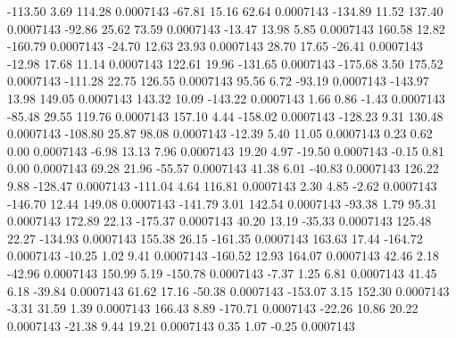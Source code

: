      -113.50        3.69      114.28     0.0007143
      -67.81       15.16       62.64     0.0007143
     -134.89       11.52      137.40     0.0007143
      -92.86       25.62       73.59     0.0007143
      -13.47       13.98        5.85     0.0007143
      160.58       12.82     -160.79     0.0007143
      -24.70       12.63       23.93     0.0007143
       28.70       17.65      -26.41     0.0007143
      -12.98       17.68       11.14     0.0007143
      122.61       19.96     -131.65     0.0007143
     -175.68        3.50      175.52     0.0007143
     -111.28       22.75      126.55     0.0007143
       95.56        6.72      -93.19     0.0007143
     -143.97       13.98      149.05     0.0007143
      143.32       10.09     -143.22     0.0007143
        1.66        0.86       -1.43     0.0007143
      -85.48       29.55      119.76     0.0007143
      157.10        4.44     -158.02     0.0007143
     -128.23        9.31      130.48     0.0007143
     -108.80       25.87       98.08     0.0007143
      -12.39        5.40       11.05     0.0007143
        0.23        0.62        0.00     0.0007143
       -6.98       13.13        7.96     0.0007143
       19.20        4.97      -19.50     0.0007143
       -0.15        0.81        0.00     0.0007143
       69.28       21.96      -55.57     0.0007143
       41.38        6.01      -40.83     0.0007143
      126.22        9.88     -128.47     0.0007143
     -111.04        4.64      116.81     0.0007143
        2.30        4.85       -2.62     0.0007143
     -146.70       12.44      149.08     0.0007143
     -141.79        3.01      142.54     0.0007143
      -93.38        1.79       95.31     0.0007143
      172.89       22.13     -175.37     0.0007143
       40.20       13.19      -35.33     0.0007143
      125.48       22.27     -134.93     0.0007143
      155.38       26.15     -161.35     0.0007143
      163.63       17.44     -164.72     0.0007143
      -10.25        1.02        9.41     0.0007143
     -160.52       12.93      164.07     0.0007143
       42.46        2.18      -42.96     0.0007143
      150.99        5.19     -150.78     0.0007143
       -7.37        1.25        6.81     0.0007143
       41.45        6.18      -39.84     0.0007143
       61.62       17.16      -50.38     0.0007143
     -153.07        3.15      152.30     0.0007143
       -3.31       31.59        1.39     0.0007143
      166.43        8.89     -170.71     0.0007143
      -22.26       10.86       20.22     0.0007143
      -21.38        9.44       19.21     0.0007143
        0.35        1.07       -0.25     0.0007143
